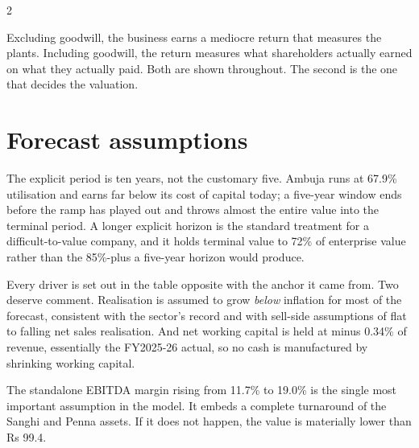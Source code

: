 \begin{paracol}{2}
\begin{okbox}
Excluding goodwill, the business earns a mediocre return that measures the plants.
Including goodwill, the return measures what shareholders actually earned on what
they actually paid. Both are shown throughout. The second is the one that decides
the valuation.
\end{okbox}

\section{Forecast assumptions}

The explicit period is ten years, not the customary five. Ambuja runs at 67.9\%
utilisation and earns far below its cost of capital today; a five-year window ends
before the ramp has played out and throws almost the entire value into the terminal
period. A longer explicit horizon is the standard treatment for a difficult-to-value
company, and it holds terminal value to 72\% of enterprise value rather than the
85\%-plus a five-year horizon would produce.

Every driver is set out in the table opposite with the anchor it came from. Two
deserve comment. Realisation is assumed to grow \emph{below} inflation for most of
the forecast, consistent with the sector's record and with sell-side assumptions of
flat to falling net sales realisation. And net working capital is held at minus
0.34\% of revenue, essentially the FY2025-26 actual, so no cash is manufactured by
shrinking working capital.

\begin{warnbox}
The standalone EBITDA margin rising from 11.7\% to 19.0\% is the single most
important assumption in the model. It embeds a complete turnaround of the Sanghi and
Penna assets. If it does not happen, the value is materially lower than Rs 99.4.
\end{warnbox}


\end{paracol}
